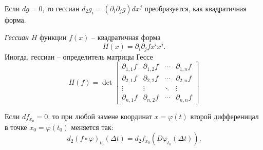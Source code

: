 \begin{to_lem} 
    Если $dg =0$, то гессиан $d_2 g_i = (\partial_i \partial_j g) dx^j$ преобразуется, как квадратичная форма. 
\end{to_lem}

\begin{to_def} 
    \textit{Гессиан} $H$ функции $f(x)$ -- квадратичная форма
    \begin{equation*}
        H(x) = \partial_i \partial_j f x^i x^j.
    \end{equation*}
    Иногда, гессиан -- определитель матрицы Гессе
    \begin{equation*}
        H(f) = \det \begin{bmatrix}
            \partial_{1,1} f & \partial_{1,2} f 
            & \cdots & \partial_{1,n} f\\
            \partial_{2,1} f & \partial_{2,2} f
            & \cdots & \partial_{2,n} f\\
            \vdots & \vdots & \ddots & \vdots \\
            \partial_{n,1} f & \partial_{n,2} f 
            & \cdots & \partial_{n,n} f
        \end{bmatrix}
    \end{equation*}
\end{to_def}

\begin{to_lem} 
    Если $df_{x_0} = 0$, то при любой замене координат $x = \varphi(t)$ второй дифференицал в точке $x_0 = \varphi(t_0)$ меняется так:
    \begin{equation*}
         d_2 (f \circ \varphi)_{t_0} (\Delta t) = d_2 f_{x_0} (D \varphi_{t_0} (\Delta t)).
     \end{equation*} 
\end{to_lem}